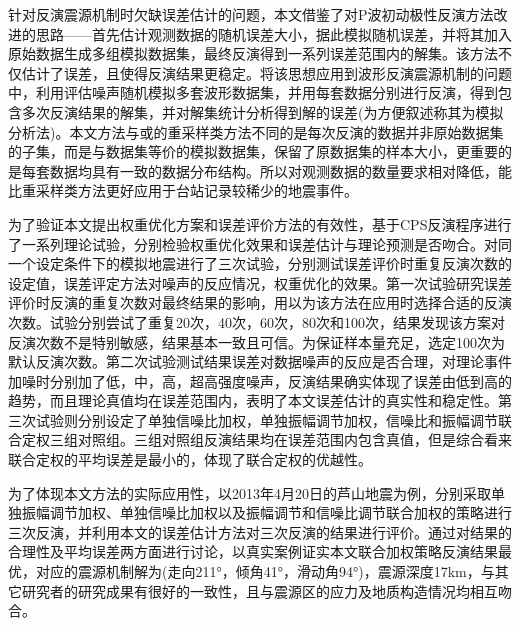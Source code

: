 针对反演震源机制时欠缺误差估计的问题，本文借鉴了\citet{Hardebeck2002}对P波初动极性反演方法改进的思路——首先估计观测数据的随机误差大小，据此模拟随机误差，并将其加入原始数据生成多组模拟数据集，最终反演得到一系列误差范围内的解集。该方法不仅估计了误差，且使得反演结果更稳定\citep{Hardebeck2002}。将该思想应用到波形反演震源机制的问题中，利用评估噪声随机模拟多套波形数据集，并用每套数据分别进行反演，得到包含多次反演结果的解集，并对解集统计分析得到解的误差(为方便叙述称其为模拟分析法)。本文方法与或\citet{Efron1979}的重采样类方法不同的是每次反演的数据并非原始数据集的子集，而是与数据集等价的模拟数据集，保留了原数据集的样本大小，更重要的是每套数据均具有一致的数据分布结构。所以对观测数据的数量要求相对降低，能比重采样类方法更好应用于台站记录较稀少的地震事件。

为了验证本文提出权重优化方案和误差评价方法的有效性，基于CPS反演程序进行了一系列理论试验，分别检验权重优化效果和误差估计与理论预测是否吻合。对同一个设定条件下的模拟地震进行了三次试验，分别测试误差评价时重复反演次数的设定值，误差评定方法对噪声的反应情况，权重优化的效果。第一次试验研究误差评价时反演的重复次数对最终结果的影响，用以为该方法在应用时选择合适的反演次数。试验分别尝试了重复20次，40次，60次，80次和100次，结果发现该方案对反演次数不是特别敏感，结果基本一致且可信。为保证样本量充足，选定100次为默认反演次数。第二次试验测试结果误差对数据噪声的反应是否合理，对理论事件加噪时分别加了低，中，高，超高强度噪声，反演结果确实体现了误差由低到高的趋势，而且理论真值均在误差范围内，表明了本文误差估计的真实性和稳定性。第三次试验则分别设定了单独信噪比加权，单独振幅调节加权，信噪比和振幅调节联合定权三组对照组。三组对照组反演结果均在误差范围内包含真值，但是综合看来联合定权的平均误差是最小的，体现了联合定权的优越性。

为了体现本文方法的实际应用性，以2013年4月20日的芦山地震为例，分别采取单独振幅调节加权、单独信噪比加权以及振幅调节和信噪比调节联合加权的策略进行三次反演，并利用本文的误差估计方法对三次反演的结果进行评价。通过对结果的合理性及平均误差两方面进行讨论，以真实案例证实本文联合加权策略反演结果最优，对应的震源机制解为(走向211°，倾角41°，滑动角94°)，震源深度17km，与其它研究者的研究成果有很好的一致性，且与震源区的应力及地质构造情况均相互吻合。
